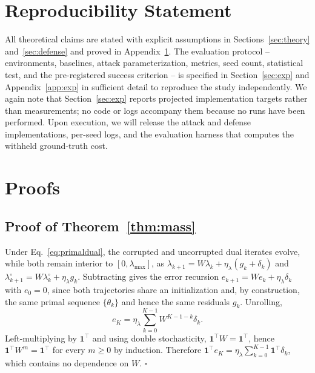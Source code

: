 \documentclass{article}
\begin{document}
\section*{Reproducibility Statement}

All theoretical claims are stated with explicit assumptions in Sections~\ref{sec:theory} and~\ref{sec:defense} and proved in Appendix~\ref{app:proofs}. The evaluation protocol -- environments, baselines, attack parameterization, metrics, seed count, statistical test, and the pre-registered success criterion -- is specified in Section~\ref{sec:exp} and Appendix~\ref{app:exp} in sufficient detail to reproduce the study independently. We again note that Section~\ref{sec:exp} reports projected implementation targets rather than measurements; no code or logs accompany them because no runs have been performed. Upon execution, we will release the attack and defense implementations, per-seed logs, and the evaluation harness that computes the withheld ground-truth cost.




\appendix

\section{Proofs}
\label{app:proofs}

\subsection{Proof of Theorem~\ref{thm:mass}}

Under Eq.~\eqref{eq:primaldual}, the corrupted and uncorrupted dual iterates evolve, while both remain interior to $[0,\lambda_{\max}]$, as $\lambda_{k+1} = W\lambda_k + \eta_\lambda(g_k + \delta_k)$ and $\lambda^\circ_{k+1} = W\lambda^\circ_k + \eta_\lambda g_k$. Subtracting gives the error recursion $e_{k+1} = We_k + \eta_\lambda\delta_k$ with $e_0 = 0$, since both trajectories share an initialization and, by construction, the same primal sequence $\{\theta_k\}$ and hence the same residuals $g_k$. Unrolling,
\[
e_K = \eta_\lambda\sum_{k=0}^{K-1} W^{K-1-k}\delta_k .
\]
Left-multiplying by $\mathbf{1}^\top$ and using double stochasticity, $\mathbf{1}^\top W = \mathbf{1}^\top$, hence $\mathbf{1}^\top W^{m} = \mathbf{1}^\top$ for every $m \ge 0$ by induction. Therefore $\mathbf{1}^\top e_K = \eta_\lambda\sum_{k=0}^{K-1}\mathbf{1}^\top\delta_k$, which contains no dependence on $W$. $\square$
\end{document}
